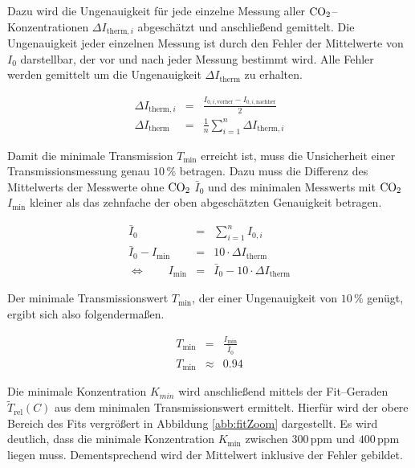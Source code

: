 \documentclass[12pt,a4paper]{scrartcl}
\numberwithin{equation}{section} %
\begin{document}
Dazu wird die Ungenauigkeit für jede einzelne Messung aller $\ce{CO_2}$--Konzentrationen $\Delta I_{\mathrm{therm}, i}$ abgeschätzt und anschließend gemittelt. Die Ungenauigkeit jeder einzelnen Messung ist durch den Fehler der Mittelwerte von $I_0$ darstellbar, der vor und nach jeder Messung bestimmt wird. Alle Fehler werden gemittelt um die Ungenauigkeit $\Delta I_\mathrm{therm}$ zu erhalten.

\begin{eqnarray}
  \Delta I_{\mathrm{therm}, i} &=& \frac{I_{0, i, \mathrm{vorher}} - I_{0, i, \mathrm{nachher}}}{2} \\
  \Delta I_\mathrm{therm} &=& \frac{1}{n} \sum_{i = 1}^{n} \Delta I_{\mathrm{therm}, i}
\end{eqnarray}

\noindent
Damit die minimale Transmission $T_\mathrm{min}$ erreicht ist, muss die Unsicherheit einer Transmissionsmessung genau $10 \mathrm{\, \%}$ betragen. Dazu muss die Differenz des Mittelwerts der Messwerte ohne $\ce{CO_2}$ $\bar{I}_{0}$ und des minimalen Messwerts mit $\ce{CO_2}$ $I_\mathrm{min}$ kleiner als das zehnfache der oben abgeschätzten Genauigkeit betragen.

\begin{eqnarray}
  \bar{I}_0 &=& \sum_{i=1}^{n} I_{0, i} \\
  \bar{I}_0 - I_\mathrm{min} &=& 10 \cdot \Delta I_\mathrm{therm} \\
  \Leftrightarrow \qquad I_\mathrm{min} &=& \bar{I}_0 - 10 \cdot \Delta I_\mathrm{therm}
\end{eqnarray}

\noindent
Der minimale Transmissionswert $T_\mathrm{min}$, der einer Ungenauigkeit von $10 \mathrm{\, \%}$ genügt, ergibt sich also folgendermaßen.

\begin{eqnarray}
  T_\mathrm{min} &=& \frac{I_\mathrm{min}}{\bar{I}_0} \\
  T_\mathrm{min} &\approx& 0.94
\end{eqnarray}

\noindent
Die minimale Konzentration $K_{min}$ wird anschließend mittels der Fit--Geraden $\tilde{T}_\mathrm{rel}(C)$ aus dem minimalen Transmissionswert ermittelt. Hierfür wird der obere Bereich des Fits vergrößert in Abbildung \ref{abb:fitZoom} dargestellt. Es wird deutlich, dass die minimale Konzentration $K_\mathrm{min}$ zwischen $300 \mathrm{\, ppm}$ und $400 \mathrm{\, ppm}$ liegen muss. Dementsprechend wird der Mittelwert inklusive der Fehler gebildet.
\end{document}

